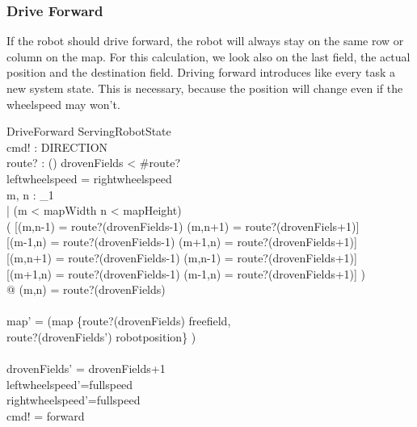\documentclass[11pt,a4paper]{article}
\begin{document}
\subsubsection{Drive Forward}
If the robot should drive forward, the robot will always stay on the same row or column on the map. For this calculation, we look also on the last field, the actual position and the destination field. Driving forward introduces like every task a new system state. This is necessary, because the position will change even if the wheelspeed may won't.
\begin{schema}{DriveForward}
\Delta ServingRobotState\\
cmd! : DIRECTION\\
route? : \iseq (\nat \cross \nat)
\where
drovenFields < \#route?\\
leftwheelspeed = rightwheelspeed\\
\forall m, n : \nat_1 \\
\hspace{20pt} | (m < mapWidth \land n < mapHeight) \land  \\
\hspace{20pt} ( [(m,n-1) = route?(drovenFields-1) \land (m,n+1) = route?(drovenFiels+1)] \lor \\
\hspace{30pt}   [(m-1,n) = route?(drovenFields-1) \land (m+1,n) = route?(drovenFields+1)] \lor \\
\hspace{30pt}   [(m,n+1) = route?(drovenFields-1) \land (m,n-1) = route?(drovenFields+1)] \lor \\
\hspace{30pt}   [(m+1,n) = route?(drovenFields-1) \land (m-1,n) = route?(drovenFields+1)] )\\
\hspace{20pt}@ (m,n) = route?(drovenFields)\\
\\
map' = (map \oplus \{route?(drovenFields) \mapsto freefield,\\ 
\hspace{85pt} route?(drovenFields') \mapsto robotposition\} ) \\\\

drovenFields' = drovenFields+1\\
leftwheelspeed'=fullspeed\\
rightwheelspeed'=fullspeed\\
cmd! = forward
\end{schema}
\end{document}
